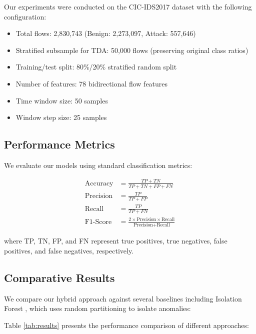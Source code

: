 \documentclass[conference]{IEEEtran}
\begin{document}
Our experiments were conducted on the CIC-IDS2017 dataset with the following configuration:

\begin{itemize}
\item Total flows: 2,830,743 (Benign: 2,273,097, Attack: 557,646)
\item Stratified subsample for TDA: 50,000 flows (preserving original class ratios)
\item Training/test split: 80\%/20\% stratified random split
\item Number of features: 78 bidirectional flow features
\item Time window size: 50 samples
\item Window step size: 25 samples
\end{itemize}

\subsection{Performance Metrics}

We evaluate our models using standard classification metrics:

\begin{align}
\text{Accuracy} &= \frac{TP + TN}{TP + TN + FP + FN} \\
\text{Precision} &= \frac{TP}{TP + FP} \\
\text{Recall} &= \frac{TP}{TP + FN} \\
\text{F1-Score} &= \frac{2 \times \text{Precision} \times \text{Recall}}{\text{Precision} + \text{Recall}}
\end{align}

where TP, TN, FP, and FN represent true positives, true negatives, false positives, and false negatives, respectively.

\subsection{Comparative Results}

We compare our hybrid approach against several baselines including Isolation Forest \cite{ref16}, which uses random partitioning to isolate anomalies:

Table \ref{tab:results} presents the performance comparison of different approaches:
\end{document}
